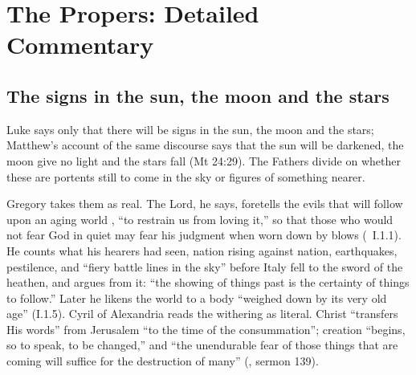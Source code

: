 
\section{The Propers: Detailed Commentary}

\subsection{The signs in the sun, the moon and the stars}

Luke says only that there will be signs in the sun, the moon and the stars;
Matthew's account of the same discourse says that the sun will be darkened,
the moon give no light and the stars fall (Mt 24:29). The Fathers divide on
whether these are portents still to come in the sky or figures of something
nearer.

Gregory takes them as real. The Lord, he says, foretells the evils that will
follow upon an aging world , ``to
restrain us from loving it,'' so that those who would not fear God in quiet
may fear his judgment when worn down by blows (~I.1.1). He
counts what his hearers had seen, nation rising against nation, earthquakes,
pestilence, and ``fiery battle lines in the sky'' before Italy fell to the
sword of the heathen, and argues from it: ``the showing of things past is the
certainty of things to follow.'' Later he likens the world to a body ``weighed
down by its very old age'' (I.1.5). Cyril of Alexandria reads the withering
as literal. Christ ``transfers His words'' from Jerusalem ``to the time of the
consummation''; creation ``begins, so to speak, to be changed,'' and ``the
unendurable fear of those things that are coming will suffice for the
destruction of many'' (, sermon 139).

